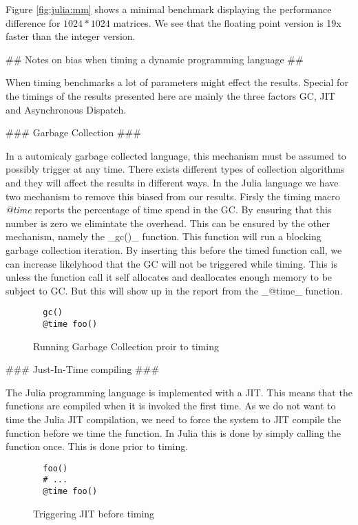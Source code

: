 \begin{markdown}
Figure \ref{fig:julia:mm} shows a minimal benchmark displaying the
performance difference for $1024*1024$ matrices. We see that the
floating point version is 19x faster than the integer version.


## Notes on bias when timing a dynamic programming language ##

When timing benchmarks a lot of parameters might effect the
results. Special for the timings of the results presented here are
mainly the three factors \gls{GC}, \gls{JIT} and Asynchronous
Dispatch.

### Garbage Collection ###

In a automicaly garbage collected language, this mechanism must be
assumed to possibly trigger at any time. There exists different types
of collection algorithms and they will affect the results in different
ways. In the Julia language we have two mechanism to remove this
biased from our results. Firsly the timing macro \textit{@time} reports the
percentage of time spend in the \gls{GC}. By ensuring that this number
is zero we elimintate the overhead. This can be ensured by the other
mechanism, namely the _gc()_ function. This function will run a
blocking garbage collection iteration. By inserting this before the
timed function call, we can increase likelyhood that the \gls{GC} will
not be triggered while timing. This is unless the function call it
self allocates and deallocates enough memory to be subject to
\gls{GC}. But this will show up in the report from the _@time_ function.


\begin{figure}[H]
  \begin{verbatim}
  gc()
  @time foo()    
  \end{verbatim}
  \caption{Running Garbage Collection proir to timing}
\end{figure}

### Just-In-Time compiling ###

The Julia programming language is implemented with a \gls{JIT}. This
means that the functions are compiled when it is invoked the first
time. As we do not want to time the Julia \gls{JIT} compilation, we
need to force the system to \gls{JIT} compile the function before we
time the function. In Julia this is done by simply calling the
function once. This is done prior to timing.

\begin{figure}[H]
  \begin{verbatim}
  foo()
  # ...
  @time foo()
  \end{verbatim}
  \caption{Triggering JIT before timing}
\end{figure}


\end{markdown}

